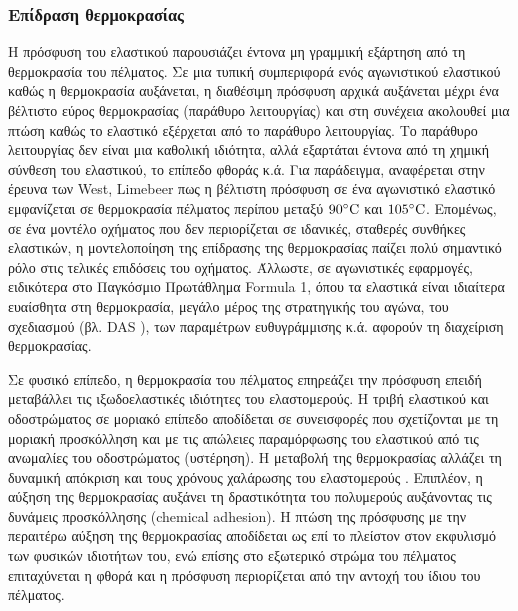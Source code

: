 \subsubsection{Επίδραση θερμοκρασίας}
\label{subsubsec:temp_effect}
Η πρόσφυση του ελαστικού παρουσιάζει έντονα μη γραμμική εξάρτηση από τη
θερμοκρασία του πέλματος. Σε μια τυπική συμπεριφορά ενός αγωνιστικού ελαστικού
καθώς η θερμοκρασία αυξάνεται, η διαθέσιμη πρόσφυση αρχικά αυξάνεται 
μέχρι ένα βέλτιστο εύρος θερμοκρασίας (παράθυρο λειτουργίας) και στη
συνέχεια ακολουθεί μια πτώση καθώς το ελαστικό εξέρχεται από το παράθυρο λειτουργίας.
Το παράθυρο λειτουργίας δεν είναι μια καθολική ιδιότητα, 
αλλά εξαρτάται έντονα από τη χημική σύνθεση του ελαστικού, το επίπεδο φθοράς κ.ά.
Για παράδειγμα, αναφέρεται στην έρευνα των West, Limebeer \cite{West2022}
πως η βέλτιστη πρόσφυση σε ένα αγωνιστικό ελαστικό εμφανίζεται 
σε θερμοκρασία πέλματος περίπου μεταξύ $90^{\circ}\mathrm{C}$ και
$105^{\circ}\mathrm{C}$. Επομένως, σε ένα μοντέλο οχήματος που
δεν περιορίζεται σε ιδανικές, σταθερές συνθήκες ελαστικών, η μοντελοποίηση της επίδρασης της θερμοκρασίας
παίζει πολύ σημαντικό ρόλο στις τελικές επιδόσεις του οχήματος. Άλλωστε, σε
αγωνιστικές εφαρμογές, ειδικότερα στο Παγκόσμιο Πρωτάθλημα Formula 1, όπου
τα ελαστικά είναι ιδιαίτερα ευαίσθητα στη θερμοκρασία, μεγάλο μέρος της
στρατηγικής του αγώνα, του σχεδιασμού (βλ. DAS \cite{WikipediaDualAxisSteering}),
των παραμέτρων ευθυγράμμισης κ.ά. αφορούν τη διαχείριση θερμοκρασίας.

Σε φυσικό επίπεδο, η θερμοκρασία του πέλματος επηρεάζει την πρόσφυση επειδή
μεταβάλλει τις ιξωδοελαστικές ιδιότητες του ελαστομερούς. Η τριβή
ελαστικού και οδοστρώματος σε μοριακό επίπεδο αποδίδεται σε
συνεισφορές που σχετίζονται με τη μοριακή προσκόλληση και με τις απώλειες
παραμόρφωσης του ελαστικού από τις ανωμαλίες του οδοστρώματος (υστέρηση). 
Η μεταβολή της θερμοκρασίας αλλάζει τη δυναμική απόκριση και τους χρόνους 
χαλάρωσης του ελαστομερούς \cite{Grosch1963}. Επιπλέον, η αύξηση της θερμοκρασίας αυξάνει τη
δραστικότητα του πολυμερούς αυξάνοντας τις δυνάμεις προσκόλλησης (chemical adhesion). Η πτώση
της πρόσφυσης με την περαιτέρω αύξηση της θερμοκρασίας αποδίδεται ως επί το πλείστον
στον εκφυλισμό των φυσικών ιδιοτήτων του, ενώ επίσης στο εξωτερικό στρώμα του πέλματος
επιταχύνεται η φθορά και η πρόσφυση περιορίζεται από την 
αντοχή του ίδιου του πέλματος.
